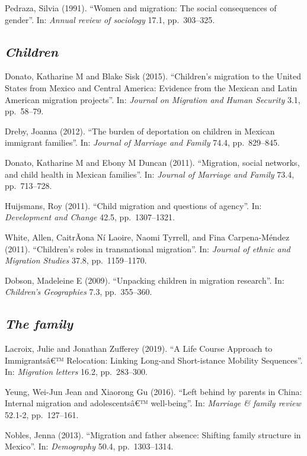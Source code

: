 \documentclass[
  12pt,
]{article}
\begin{document}
Pedraza, Silvia (1991). ``Women and migration: The social consequences
of gender''. In: \emph{Annual review of sociology} 17.1, pp.~303--325.

\hypertarget{children}{%
\subsection{\texorpdfstring{\emph{Children}}{Children}}\label{children}}

Donato, Katharine M and Blake Sisk (2015). ``Children's migration to the
United States from Mexico and Central America: Evidence from the Mexican
and Latin American migration projects''. In:
\emph{Journal on Migration and Human Security} 3.1, pp.~58--79.

Dreby, Joanna (2012). ``The burden of deportation on children in Mexican
immigrant families''. In: \emph{Journal of Marriage and Family} 74.4,
pp.~829--845.

Donato, Katharine M and Ebony M Duncan (2011). ``Migration, social
networks, and child health in Mexican families''. In:
\emph{Journal of Marriage and Family} 73.4, pp.~713--728.

Huijsmans, Roy (2011). ``Child migration and questions of agency''. In:
\emph{Development and Change} 42.5, pp.~1307--1321.

White, Allen, CaitrÃ­ona Ní Laoire, Naomi Tyrrell, and Fina
Carpena-Méndez (2011). ``Children's roles in transnational migration''.
In: \emph{Journal of ethnic and Migration Studies} 37.8, pp.~1159--1170.

Dobson, Madeleine E (2009). ``Unpacking children in migration
research''. In: \emph{Children's Geographies} 7.3, pp.~355--360.

\hypertarget{the-family}{%
\subsection{\texorpdfstring{\emph{The
family}}{The family}}\label{the-family}}

Lacroix, Julie and Jonathan Zufferey (2019). ``A Life Course Approach to
Immigrantsâ€™ Relocation: Linking Long-and Short-istance Mobility
Sequences''. In: \emph{Migration letters} 16.2, pp.~283--300.

Yeung, Wei-Jun Jean and Xiaorong Gu (2016). ``Left behind by parents in
China: Internal migration and adolescentsâ€™ well-being''. In:
\emph{Marriage \& family review} 52.1-2, pp.~127--161.

Nobles, Jenna (2013). ``Migration and father absence: Shifting family
structure in Mexico''. In: \emph{Demography} 50.4, pp.~1303--1314.
\end{document}

